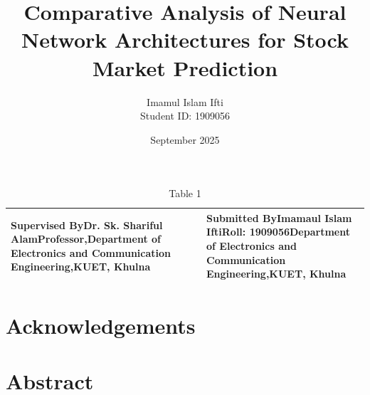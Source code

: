 \documentclass[12pt,a4paper]{report}
\title{Comparative Analysis of Neural Network Architectures for Stock Market Prediction}
\author{Imamul Islam Ifti\\Student ID: 1909056}
\date{September 2025}
\begin{document}
\maketitle

\frontmatter

\begin{table}[htbp]
\centering
\begin{tabular}{|l|l|}
\hline
\textbf{Supervised By}Dr. Sk. Shariful AlamProfessor,Department of Electronics and Communication Engineering,KUET, Khulna & \textbf{Submitted By}Imamaul Islam IftiRoll: 1909056Department of Electronics and Communication Engineering,KUET, Khulna \\
\hline
\end{tabular}
\caption{Table 1}
\label{tab:table1}
\end{table}

\chapter*{Acknowledgements}

\chapter*{Abstract}

\tableofcontents
\newpage

\listoffigures
\newpage
\end{document}
